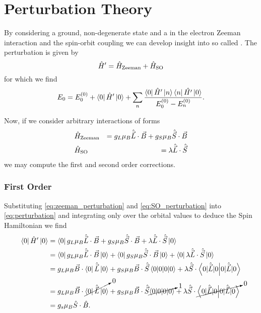 \section{Perturbation Theory}
By considering a ground, non-degenerate state and a  in the electron Zeeman interaction and the spin-orbit coupling we can develop insight into so called . The perturbation is given by 
\begin{equation}
    \hat{H}' = \hat{H}_{\ce{Zeeman}} + \hat{H}_{\ce{SO}}  
\end{equation}
for which we find 
\begin{equation}
    E_0 = E^{(0)}_0 + \bra{0}{\hat{H}'}\ket{0}  + \sum_{n}\frac{\bra{0} \hat{H}' \ket{n} \bra{n} \hat{H'}\ket{0}}{E_0^{(0)} - E_n^{(0)}}.
    \label{eq:perturbation}
\end{equation}

Now, if we consider arbitrary interactions of forms
\begin{eqnarray}
    &\hat{H}_{\ce{Zeeman}} &= g_L \mu_B \hat{\vec{L}}\cdot\vec{B} + g_S \mu_B \hat{\vec{S}}\cdot\vec{B} \label{eq:zeeman_perturbation}\\ 
    & \hat{H}_{\ce{SO}} &= \lambda\hat{\vec{L}}\cdot \hat{\vec{S}} \label{eq:SO_perturbation}
\end{eqnarray}
we may compute the first and second order corrections. 


\subsubsection{First Order}
Substituting \eqref{eq:zeeman_perturbation} and \eqref{eq:SO_perturbation} into \eqref{eq:perturbation} and integrating only over the orbital values to deduce the Spin Hamiltonian we find
\begin{equation}
   \begin{align}
       \bra{0} \hat{H}' \ket{0} &= \bra{0} g_L \mu_B \hat{\vec{L}}\cdot \vec{B} + g_S \mu_B \hat{\vec{S}}\cdot \vec{B} + \lambda\hat{\vec{L}} \cdot \hat{\vec{S}} \ket{0}\\ 
                                & = \bra{0} g_L\mu_B \hat{\vec{L}} \cdot \vec{B} \ket{0} + \bra{0}g_S \mu_B \hat{\vec{S}}\cdot \vec{B}\ket{0} + \bra{0}\lambda\hat{\vec{L}} \cdot \hat{\vec{S}} \ket{0}\\
                                &= g_L\mu_B \vec{B} \cdot \bra{0}\hat{\vec{L}}\ket{0} + g_S \mu_B  \vec{B} \cdot \hat{\vec{S}}\braket{0|0} + \lambda \hat{\vec{S}} \cdot \braket{0|\hat{\vec{L}}|0}\\ 
                                &= g_L\mu_B \vec{B} \cdot \cancelto{0}{\bra{0}\hat{\vec{L}}\ket{0}} + g_S \mu_B  \vec{B} \cdot \hat{\vec{S}}\cancelto{1}{\braket{0|0}} + \lambda \hat{\vec{S}} \cdot \cancelto{0}{\braket{0|\hat{\vec{L}}|0}}\\ 
                                &= g_s \mu_B \hat{S}\cdot\hat{B}.
   \end{align} 
    \label{eq:first_order}
\end{equation}

